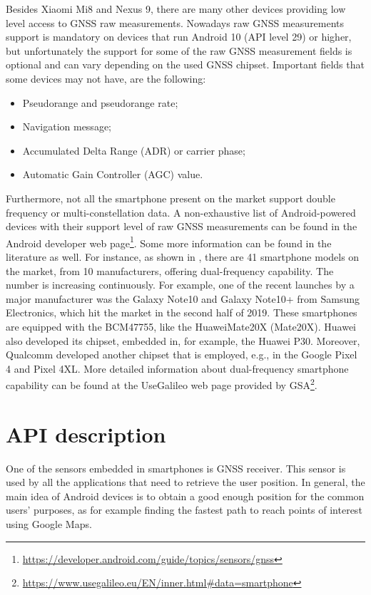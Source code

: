 Besides Xiaomi Mi8 and Nexus 9, there are many other devices providing low level access to GNSS raw measurements. 
Nowadays raw GNSS measurements support is mandatory on devices that run Android 10 (API level 29) or higher, but unfortunately the support for some of the raw GNSS measurement fields is optional and can vary depending on the used GNSS chipset. Important fields that some devices may not have, are the following:
\begin{itemize}
\item Pseudorange and pseudorange rate;
\item Navigation message;
\item Accumulated Delta Range (ADR) or carrier phase;
\item Automatic Gain Controller (AGC) value.
\end{itemize}
Furthermore, not all the smartphone present on the market support double frequency or multi-constellation data. A non-exhaustive list of Android-powered devices with their support level of raw GNSS measurements can be found in the Android developer web page\footnote{\url{https://developer.android.com/guide/topics/sensors/gnss}}. Some more information can be found in the literature as well. For instance, as shown in \cite{darugna2021}, there are 41 smartphone models on the market, from 10 manufacturers,  offering dual-frequency capability. The number is increasing continuously. For example, one of the recent launches by a major manufacturer was the Galaxy Note10 and Galaxy Note10+ from Samsung Electronics, which hit the market in the second half of 2019. These smartphones are equipped with the BCM47755, like the HuaweiMate20X (Mate20X). Huawei also developed its chipset, embedded in, for example, the Huawei P30. Moreover, Qualcomm developed another chipset that is employed, e.g., in the Google Pixel 4 and Pixel 4XL. 
More detailed information about dual-frequency smartphone capability can be found at the UseGalileo web page provided by GSA\footnote{\url{https://www.usegalileo.eu/EN/inner.html#data=smartphone}}.
\section{API description}

One of the sensors embedded in smartphones is GNSS receiver. This sensor is used by all the applications that need to retrieve the user position. In general, the main idea of Android devices is to obtain
a good enough position for the common users’ purposes, as for example finding the fastest path to reach points of interest using Google Maps.

